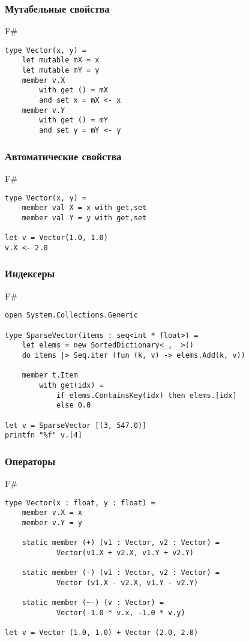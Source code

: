 \documentclass[xetex,mathserif,serif]{beamer}
\begin{document}
   	\begin{frame}[fragile]
   		\frametitle{Мутабельные свойства}
   		\begin{exampleblock}{F\#}
   			\begin{lstlisting}
type Vector(x, y) = 
    let mutable mX = x
    let mutable mY = y
    member v.X 
        with get () = mX
        and set x = mX <- x
    member v.Y
        with get () = mY
        and set y = mY <- y
\end{lstlisting}
\end{exampleblock}
\end{frame}

   	\begin{frame}[fragile]
   		\frametitle{Автоматические свойства}
   		\begin{exampleblock}{F\#}
   			\begin{lstlisting}
type Vector(x, y) = 
    member val X = x with get,set
    member val Y = y with get,set

let v = Vector(1.0, 1.0)
v.X <- 2.0
\end{lstlisting}
\end{exampleblock}
\end{frame}

   	\begin{frame}[fragile]
   		\frametitle{Индексеры}
   		\begin{exampleblock}{F\#}
   			\begin{lstlisting}
open System.Collections.Generic

type SparseVector(items : seq<int * float>) =
    let elems = new SortedDictionary<_, _>()
    do items |> Seq.iter (fun (k, v) -> elems.Add(k, v))

    member t.Item
        with get(idx) =
            if elems.ContainsKey(idx) then elems.[idx]
            else 0.0
            
let v = SparseVector [(3, 547.0)]
printfn "%f" v.[4]
\end{lstlisting}
\end{exampleblock}
\end{frame}

   	\begin{frame}[fragile]
   		\frametitle{Операторы}
   		\begin{exampleblock}{F\#}
   			\begin{lstlisting}
type Vector(x : float, y : float) =
    member v.X = x
    member v.Y = y

    static member (+) (v1 : Vector, v2 : Vector) =
            Vector(v1.X + v2.X, v1.Y + v2.Y)

    static member (-) (v1 : Vector, v2 : Vector) =
            Vector (v1.X - v2.X, v1.Y - v2.Y)
			
    static member (~-) (v : Vector) =
            Vector(-1.0 * v.x, -1.0 * v.y)

let v = Vector (1.0, 1.0) + Vector (2.0, 2.0)
\end{lstlisting}
\end{exampleblock}
\end{frame}
\end{document}
